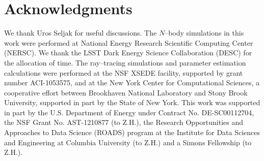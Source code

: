 \documentclass[reprint,aps,prd,superscriptaddress,showkeys,showpacs]{revtex4-1}
\begin{document}

\section*{Acknowledgments}
We thank Uros Seljak for useful discussions. The $N$--body simulations in this work were performed at National Energy Research Scientific Computing Center (NERSC). We thank the LSST Dark Energy Science Collaboration (DESC) for the allocation of time. The ray--tracing simulations and parameter estimation calculations were performed at the NSF XSEDE facility, supported by grant number
ACI-1053575, and at the New York Center for Computational Sciences, a
cooperative effort between Brookhaven National Laboratory and Stony
Brook University, supported in part by the State of New York. This
work was supported in part by the U.S. Department of Energy under
Contract No. DE-SC00112704, the NSF Grant
No. AST-1210877 (to Z.H.), the Research Opportunities and
Approaches to Data Science (ROADS) program at the Institute for Data
Sciences and Engineering at Columbia University (to Z.H.) and a Simons Fellowship (to Z.H.).




\label{lastpage}
\end{document}
